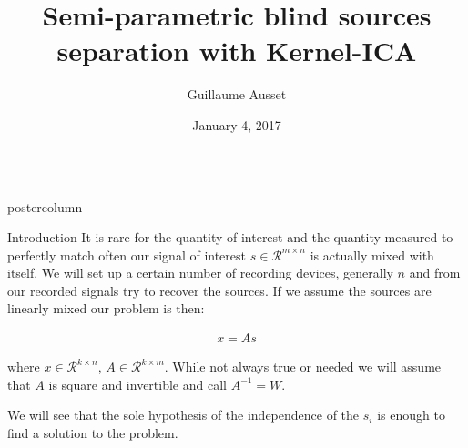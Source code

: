 \documentclass{beamer}
\title{Semi-parametric blind sources separation with \huge Kernel-ICA}
\author{Guillaume Ausset}
\institute[MASH]{Université Paris Dauphine}
\date{January 4, 2017}
\newlength{\columnheight}
\begin{document}
\begin{frame}
\begin{columns}
	\begin{column}{.5\textwidth}
		\begin{beamercolorbox}[center]{postercolumn}
			\begin{minipage}{.98\textwidth}  %
				\parbox[t][\columnheight]{\textwidth}{ %
					\begin{myblock}{Introduction}
					It is rare for the quantity of interest and the quantity measured to perfectly match often our signal of interest $s \in \mathcal{R}^{m \times n}$ is actually mixed with itself. We will set up a certain number of recording devices, generally $n$ and from our recorded signals try to recover the sources. If we assume the sources are linearly mixed our problem is then:

						\begin{align*}
							x = A s
						\end{align*}

						where $x \in \mathcal{R}^{k \times n}$, $A \in \mathcal{R}^{k \times m}$. While not always true or needed we will assume that $A$ is square and invertible and call $A^{-1} = W$.

						We will see that the sole hypothesis of the independence of the $s_i$ is enough to find a solution to the problem.


\end{myblock}}
\end{minipage}
\end{beamercolorbox}
\end{column}
\end{columns}
\end{frame}
\end{document}
